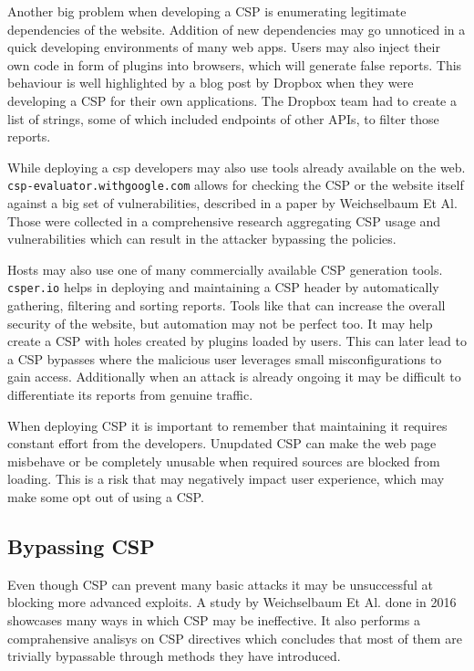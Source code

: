 Another big problem when developing a CSP is enumerating legitimate dependencies of the website.
Addition of new dependencies may go unnoticed in a quick developing environments of many web apps.
Users may also inject their own code in form of plugins into browsers, which will generate false reports.
This behaviour is well highlighted by a blog post by Dropbox when they were developing a CSP for their own applications. \cite{dropboxcsp}
The Dropbox team had to create a list of strings, some of which included endpoints of other APIs, to filter those reports.

While deploying a csp developers may also use tools already available on the web. \\ 
\texttt{csp-evaluator.withgoogle.com} allows for checking the CSP or the website itself against a big set of vulnerabilities, described in a paper by Weichselbaum Et Al. \cite{weichselbaum2016csp}
Those were collected in a comprehensive research aggregating CSP usage and vulnerabilities which can result in the attacker bypassing the policies.

Hosts may also use one of many commercially available CSP generation tools.
\texttt{csper.io} helps in deploying and maintaining a CSP header by automatically gathering, filtering and sorting reports. 
Tools like that can increase the overall security of the website, but automation may not be perfect too. 
It may help create a CSP with holes created by plugins loaded by users.
This can later lead to a CSP bypasses where the malicious user leverages small misconfigurations to gain access.
Additionally when an attack is already ongoing it may be difficult to differentiate its reports from genuine traffic.

When deploying CSP it is important to remember that maintaining it requires constant effort from the developers.
Unupdated CSP can make the web page misbehave or be completely unusable when required sources are blocked from loading.
This is a risk that may negatively impact user experience, which may make some opt out of using a CSP.


\subsection{Bypassing CSP}
Even though CSP can prevent many basic attacks it may be unsuccessful at blocking more advanced exploits.
A study by Weichselbaum Et Al. done in 2016 showcases many ways in which CSP may be ineffective. \cite{weichselbaum2016csp}
It also performs a comprahensive analisys on CSP directives which concludes that most of them are trivially bypassable through methods they have introduced.

